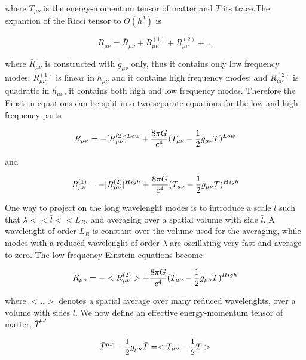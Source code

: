 \documentclass[binding=0.6cm, LaM]{sapthesis}
\begin{document}
	where $T_{\mu\nu}$ is the energy-momentum tensor of matter and $T$ its trace.The expantion of the Ricci tensor to $O(h^2)$ is

		\begin{equation}
		R_{\mu\nu} = {\bar R_{\mu\nu}} + R_{\mu\nu}^{(1)} + R_{\mu\nu}^{(2)} + ...
		\end{equation}

	where $ {\bar R_{\mu\nu}}$ is constructed with $\bar g_{\mu\nu}$ only, thus it contains only low frequency modes;
	$R_{\mu\nu}^{(1)}$ is linear in $h_{\mu\nu}$ and it contains high frequency modes;
	and $R_{\mu\nu}^{(2)} $ is quadratic in $h_{\mu\nu}$, it contains both high and low frequency modes.
	Therefore the Einstein equations can be split into two separate equations for the low and high frequency parts

		\begin{equation}
		{\bar R_{\mu\nu}} = -[R_{\mu\nu}^{(2)}]^{Low} + {{8\pi G}\over c^4}(T_{\mu\nu}- {1 \over 2}g_{\mu\nu}T) ^{Low}
		\end{equation}

	and

		\begin{equation}
 		R_{\mu\nu}^{(1)} = - [R_{\mu\nu}^{(2)}]^{High} +  {{8\pi G}\over c^4}(T_{\mu\nu}- {1 \over 2}g_{\mu\nu}T)^{High}
		\end{equation}

	One way to project on the long wavelenght modes is to introduce a scale $\bar l$ such that $\lambda << \bar l << L_B$, 
	and averaging over a spatial volume with side $\bar l$.
	A wavelenght of order $L_B$ is constant over the volume used for the averaging, 
	while modes with a reduced wavelenght of order $\lambda$ are oscillating very fast and average to zero.
	The low-frequency Einstein equations become

		\begin{equation}
 		{\bar R_{\mu\nu}} = - <R_{\mu\nu}^{(2)}> +  {{8\pi G}\over c^4}(T_{\mu\nu}- {1 \over 2}g_{\mu\nu}T) ^{High}
		\end{equation}

	where $<..>$ denotes a spatial average over many reduced wavelenghts, over a volume with sides $l$.
	We now define an effective energy-momentum tensor of matter, $\bar T^{\mu\nu}$

		\begin{equation}
		{\bar T^{\mu\nu}} - {1 \over 2}{\bar g_{\mu\nu}}{\bar T} = <T_{\mu\nu}- {1 \over 2}T>
		\end{equation}
\end{document}
